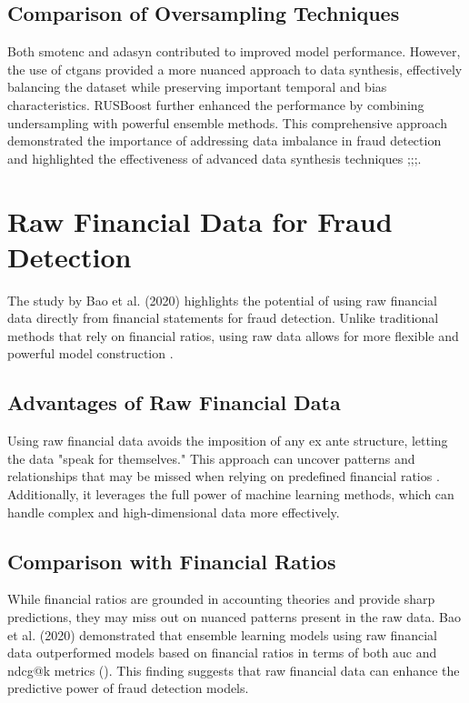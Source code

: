 \documentclass[12pt,a4paper]{report}
\begin{document}
\subsection{Comparison of Oversampling Techniques}
Both \acrshort{smotenc} and \acrshort{adasyn} contributed to improved model performance. However, the use of \acrshort{ctgan}s provided a more nuanced approach to data synthesis, effectively balancing the dataset while preserving important temporal and bias characteristics. RUSBoost further enhanced the performance by combining undersampling with powerful ensemble methods. This comprehensive approach demonstrated the importance of addressing data imbalance in fraud detection and highlighted the effectiveness of advanced data synthesis techniques \citep{chawla2002smote};\citep{he2008adasyn};\citep{jesus2022turning};\citep{bao2020detecting}.\\




\section{Raw Financial Data for Fraud Detection}
The study by Bao et al. (2020) highlights the potential of using raw financial data directly from financial statements for fraud detection. Unlike traditional methods that rely on financial ratios, using raw data allows for more flexible and powerful model construction \citep{bao2020detecting}.\\

\subsection{Advantages of Raw Financial Data}
Using raw financial data avoids the imposition of any ex ante structure, letting the data "speak for themselves." This approach can uncover patterns and relationships that may be missed when relying on predefined financial ratios \citep{bao2020detecting}. Additionally, it leverages the full power of machine learning methods, which can handle complex and high-dimensional data more effectively.

\subsection{Comparison with Financial Ratios}
While financial ratios are grounded in accounting theories and provide sharp predictions, they may miss out on nuanced patterns present in the raw data. Bao et al. (2020) demonstrated that ensemble learning models using raw financial data outperformed models based on financial ratios in terms of both \acrshort{auc} and \acrshort{ndcg@k} metrics (\citealp[p.219]{bao2020detecting}). This finding suggests that raw financial data can enhance the predictive power of fraud detection models.
\end{document}
